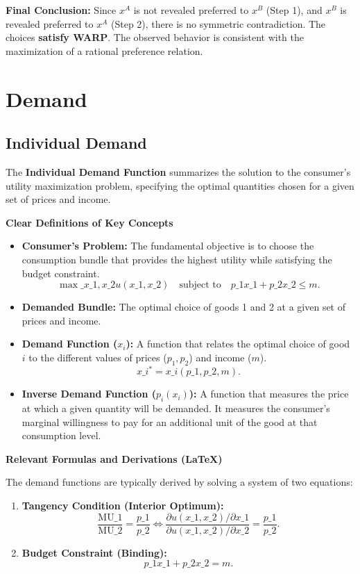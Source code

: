 \documentclass{article}
\begin{document}
\textbf{Final Conclusion:} Since $x^A$ is not revealed preferred to $x^B$ (Step 1), and $x^B$ is revealed preferred to $x^A$ (Step 2), there is no symmetric contradiction. The choices \textbf{satisfy WARP}. The observed behavior is consistent with the maximization of a rational preference relation.

\section*{Demand}
\subsection*{Individual Demand}

The \textbf{Individual Demand Function} summarizes the solution to the consumer's utility maximization problem, specifying the optimal quantities chosen for a given set of prices and income.

\vspace{1em}
\noindent\textbf{Clear Definitions of Key Concepts}
\begin{itemize}
    \item \textbf{Consumer's Problem:} The fundamental objective is to choose the consumption bundle that provides the highest utility while satisfying the budget constraint. \[\max\_{x\_1, x\_2} u(x\_1, x\_2) \quad \text{subject to} \quad p\_1 x\_1 + p\_2 x\_2 \leq m.\]
    \item \textbf{Demanded Bundle:} The optimal choice of goods 1 and 2 at a given set of prices and income.
    \item \textbf{Demand Function ($x_i$):} A function that relates the optimal choice of good $i$ to the different values of prices ($p_1, p_2$) and income ($m$). \[x\_i^* = x\_i(p\_1, p\_2, m).\]
    \item \textbf{Inverse Demand Function ($p_i(x_i)$):} A function that measures the price at which a given quantity will be demanded. It measures the consumer's marginal willingness to pay for an additional unit of the good at that consumption level.
\end{itemize}

\vspace{1em}
\noindent\textbf{Relevant Formulas and Derivations (LaTeX)}
\vspace{0.5em}

\noindent The demand functions are typically derived by solving a system of two equations:
\begin{enumerate}
    \item \textbf{Tangency Condition (Interior Optimum):} \[\frac{\text{MU}\_1}{\text{MU}\_2} = \frac{p\_1}{p\_2} \iff \frac{\partial u(x\_1, x\_2)/\partial x\_1}{\partial u(x\_1, x\_2)/\partial x\_2} = \frac{p\_1}{p\_2}.\]
    \item \textbf{Budget Constraint (Binding):} \[p\_1 x\_1 + p\_2 x\_2 = m.\]
\end{enumerate}
\end{document}
